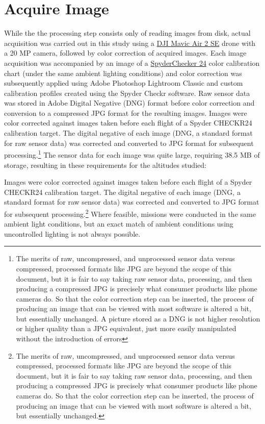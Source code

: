 \documentclass[letterpaper]{article}
\begin{document}
\section{Acquire Image}
While the the processing step consists only of reading images from disk, actual acquisition was carried out in this study using a \href{https://www.dji.com/air-2s/specs} {DJI Mavic Air 2 SE} drone with a 20 MP camera, followed by color correction of acquired images. Each image acquisition was accompanied by an image of a \href{https://www.datacolor.com/spyder/products/spyder-checkr-photo/} {SpyderChecker 24} color calibration chart (under the same ambient lighting conditions) and color correction was subsequently applied using Adobe Photoshop Lightroom Classic and custom calibration profiles created using the Spyder Checkr software. Raw sensor data was stored in Adobe Digital Negative (DNG) format before color correction and conversion to a compressed JPG format for the resulting images. Images were color corrected against images taken before each flight of a Spyder CHECKR24 calibration target. The digital negative of each image (DNG, a standard format for raw sensor data) was corrected and converted to JPG format for subsequent processing.\footnote{The merits of raw, uncompressed, and unprocessed sensor data versus compressed, processed formats like JPG are beyond the scope of this document, but it is fair to say taking raw sensor data, processing, and then producing a compressed JPG is precisely what consumer products like phone cameras do. So that the color correction step can be inserted, the process of producing an image that can be viewed with most software is altered a bit, but essentially unchanged. A picture stored as a DNG is not higher resolution or higher quality than a JPG equivalent, just more easily manipulated without the introduction of errors} The sensor data for each image was quite large, requiring 38.5 MB of storage, resulting in these requirements for the altitudes studied:

Images were color corrected against images taken before each flight of a Spyder CHECKR24 calibration target. The digital negative of each image (DNG, a standard format for raw sensor data) was corrected and converted to JPG format for subsequent processing.\footnote{The merits of raw, uncompressed, and unprocessed sensor data versus compressed, processed formats like JPG are beyond the scope of this document, but it is fair to say taking raw sensor data, processing, and then producing a compressed JPG is precisely what consumer products like phone cameras do. So that the color correction step can be inserted, the process of producing an image that can be viewed with most software is altered a bit, but essentially unchanged.}
Where feasible, missions were conducted in the same ambient light conditions, but an exact match of ambient conditions using uncontrolled lighting is not always possible.
\end{document}
